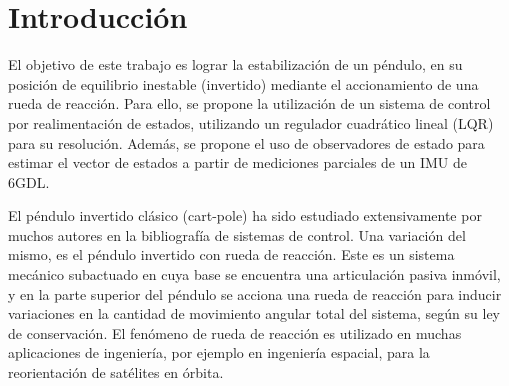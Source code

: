 \documentclass{article}
\begin{document}
\section{Introducción}
    \label{sec:intro}
    El objetivo de este trabajo es lograr la estabilización de un péndulo, en su posición de equilibrio inestable (invertido) mediante el
    accionamiento de una rueda de reacción. Para ello, se propone la utilización de un sistema de control por realimentación de estados,
    utilizando un regulador cuadrático lineal (LQR) para su resolución. Además, se propone el uso de observadores de estado para estimar
    el vector de estados a partir de mediciones parciales de un IMU de 6GDL. \newline

    El péndulo invertido clásico (cart-pole) ha sido estudiado extensivamente por muchos autores en la bibliografía de sistemas de control.
    Una variación del mismo, es el péndulo invertido con rueda de reacción. Este es un sistema mecánico subactuado en cuya base se encuentra 
    una articulación pasiva inmóvil, y en la parte superior del péndulo se acciona una rueda de reacción para inducir variaciones en la cantidad 
    de movimiento angular total del sistema, según su ley de conservación.
    El fenómeno de rueda de reacción es utilizado en muchas aplicaciones de ingeniería, por ejemplo en ingeniería espacial, para la reorientación
    de satélites en órbita.
\end{document}
